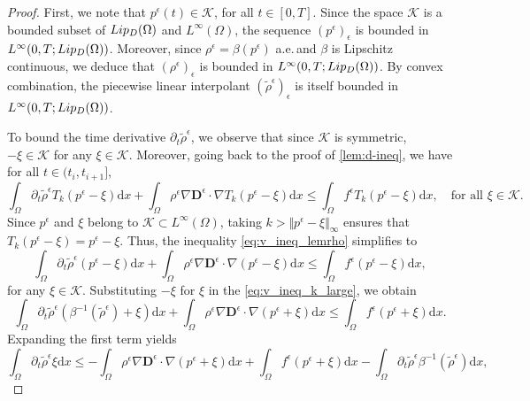 \documentclass[10pt,a4paper]{amsart}
\newcommand{\K}{\mathcal K}
\newcommand{\Lip}{\textup{Lip}}
\newcommand{\dd}{\mathrm{d}}
\newcommand{\de}{\mathbf{D}}
\newcommand{\pp}{a.e.\,}
\begin{document}
\begin{proof}
First, we note that $p^{\epsilon}(t) \in \K$, for all $t \in [0,T]$. Since the space $\K$ is a bounded subset of $\Lip_D(\Omega)$ and $L^\infty(\Omega)$, the sequence $(p^{\epsilon})_{\epsilon}$ is bounded in $L^{\infty}(0,T; \Lip_D(\Omega))$. Moreover, since $\rho^\epsilon = \beta(p^{\epsilon})$ \pp and $\beta$ is Lipschitz continuous, we deduce that $(\rho^\epsilon)_{\epsilon}$ is bounded in $L^{\infty}(0,T; \Lip_{D}(\Omega))$. By convex combination, the piecewise linear interpolant $(\tilde{\rho}^{\epsilon})_{\epsilon}$ is itself bounded in $L^\infty(0,T; \Lip_{D}(\Omega))$.

     To bound the time derivative $\partial_t \tilde{\rho}^{\epsilon}$, we observe that since $\K$ is symmetric, $-\xi \in \K$ for any $\xi \in \K$. Moreover, going back to the proof of \cref{lem:d-ineq}, we have  for all $t \in (t_i, t_{i+1}]$,
\begin{equation}\label{eq:v_ineq_lemrho}
    \int_{\Omega} \partial_t \tilde{\rho}^{\epsilon} T_k (p^\epsilon-\xi) \dd x + \int_{\Omega} \rho^\epsilon \nabla \de^\epsilon \cdot \nabla T_k(p^\epsilon-\xi) \dd x \le \int_{\Omega} f^\epsilon T_k(p^\epsilon-\xi) \dd x, \quad \text{for all } \xi \in \K.
\end{equation}
    Since $p^\epsilon$ and $\xi$ belong to $\K \subset L^\infty(\Omega)$, taking $k > \Vert p^\epsilon - \xi \Vert_\infty$ ensures that $T_k(p^\epsilon - \xi) = p^\epsilon - \xi$. Thus, the inequality \eqref{eq:v_ineq_lemrho} simplifies to
\begin{equation}\label{eq:v_ineq_k_large}
    \int_{\Omega} \partial_t \tilde{\rho}^{\epsilon} (p^\epsilon-\xi) \dd x + \int_{\Omega} \rho^{\epsilon}\nabla \de^\epsilon \cdot \nabla(p^{\epsilon}-\xi) \dd x \le \int_{\Omega} f^{\epsilon} (p^{\epsilon}-\xi) \dd x,
\end{equation}
     for any $\xi \in \K$. Substituting $-\xi$ for $\xi$ in the \eqref{eq:v_ineq_k_large}, we obtain
    \begin{equation}
        \int_{\Omega} \partial_t \tilde{\rho}^{\epsilon} (\beta^{-1}(\tilde{\rho}^{\epsilon})+\xi) \dd x + \int_{\Omega} \rho^{\epsilon}\nabla \de^\epsilon \cdot \nabla(p^{\epsilon}+\xi) \dd x \le \int_{\Omega} f^{\epsilon} (p^{\epsilon}+\xi) \dd x.
    \end{equation}	
    Expanding the first term yields
    \begin{equation}\label{eq:bound_xi}
        \int_{\Omega} \partial_t \tilde{\rho}^{\epsilon} \xi \dd x \leq - \int_{\Omega} \rho^{\epsilon}\nabla \de^\epsilon \cdot \nabla(p^{\epsilon}+\xi) \dd x + \int_{\Omega} f^{\epsilon} (p^{\epsilon}+\xi) \dd x - \int_{\Omega} \partial_t \tilde{\rho}^{\epsilon} \beta^{-1}(\tilde{\rho}^{\epsilon}) \dd x, 

\end{equation}
\end{proof}
\end{document}
